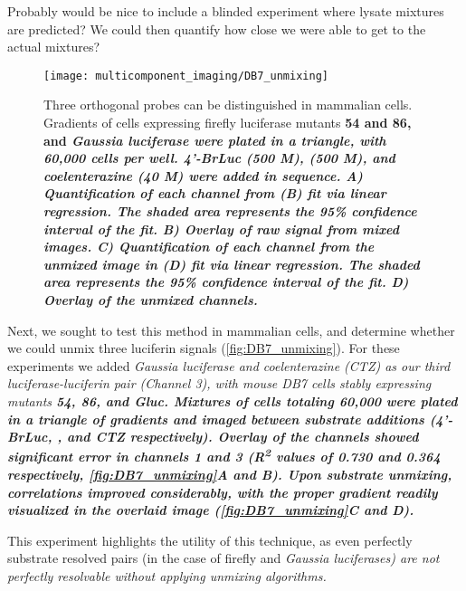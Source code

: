 \begin{thoughts}
  Probably would be nice to include a blinded experiment where lysate mixtures are predicted? We could then quantify how close we were able to get to the actual mixtures?
\end{thoughts}

\begin{figure}[htbp]
\texttt{[image: multicomponent\_imaging/DB7\_unmixing]}
\centering
\caption[Orthogonal bioluminescent probes can be distinguished in mammalian cells]{
Three orthogonal probes can be distinguished in mammalian cells. Gradients of cells expressing firefly luciferase mutants \bf{54} and \bf{86}, and \it{Gaussia} luciferase were plated in a triangle, with 60,000 cells per well. \bf{4'-BrLuc} (500 \textmu{}M), \dluciferin{} (500 \textmu{}M), and coelenterazine (40 \textmu{}M) were added in sequence. \bf{A)} Quantification of each channel from (B) fit via linear regression. The shaded area represents the 95\% confidence interval of the fit. \bf{B)} Overlay of raw signal from mixed images. \bf{C)} Quantification of each channel from the unmixed image in (D) fit via linear regression. The shaded area represents the 95\% confidence interval of the fit. \bf{D)} Overlay of the unmixed channels.
}
  \label{fig:DB7_unmixing}
\end{figure}

Next, we sought to test this method in mammalian cells, and determine whether we could unmix three luciferin signals (\autoref{fig:DB7_unmixing}). For these experiments we added \it{Gaussia} luciferase and coelenterazine (CTZ) as our third luciferase-luciferin pair (Channel 3), with mouse DB7 cells stably expressing mutants \bf{54}, \bf{86}, and \bf{Gluc}. Mixtures of cells totaling 60,000 were plated in a triangle of gradients and imaged between substrate additions (\bf{4'-BrLuc}, \dluc{}, and CTZ respectively). Overlay of the channels showed significant error in channels 1 and 3 (R\textsuperscript{2} values of 0.730 and 0.364 respectively, \autoref{fig:DB7_unmixing}A and B). Upon substrate unmixing, correlations improved considerably, with the proper gradient readily visualized in the overlaid image (\autoref{fig:DB7_unmixing}C and D).

This experiment highlights the utility of this technique, as even perfectly substrate resolved pairs (in the case of firefly and \it{Gaussia} luciferases) are not perfectly resolvable without applying unmixing algorithms.

